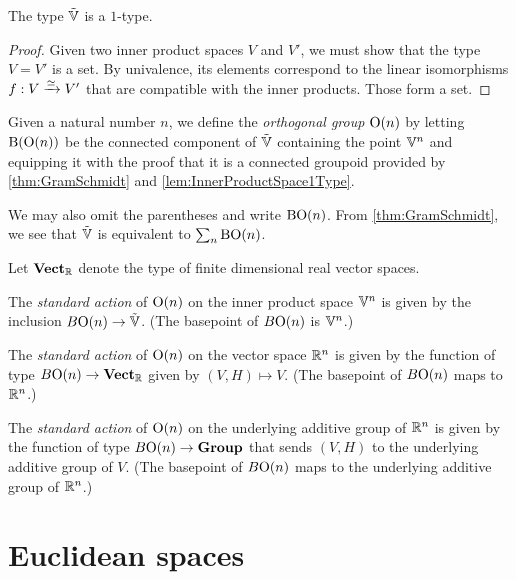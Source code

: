 \begin{lemma}\label{lem:InnerProductSpace1Type}
  The type ${\tilde {\mathbb V}}$ is a $1$-type.
\end{lemma}

\begin{proof}
  Given two inner product spaces $V$ and $V'$, we must show that the type
  $V=V'$ is a set.  By univalence, its elements correspond to the linear
  isomorphisms $f : V \xrightarrow {\simeq} V'$ that are compatible with the
  inner products.  Those form a set.
\end{proof}

\begin{definition}\label{def:OrthogonalGroup}
  Given a natural number $n$, we define the {\em orthogonal group} $\mathrm O(n)$
  by letting $\mathrm B (\mathrm O(n))$ be the connected component of ${\tilde {\mathbb V}}$ containing
  the point $\mathbb V^n$ and equipping it with the proof that it is a connected
  groupoid provided by \cref{thm:GramSchmidt} and
  \cref{lem:InnerProductSpace1Type}.
\end{definition}

We may also omit the parentheses and write $\mathrm B\mathrm O(n)$.
From \cref{thm:GramSchmidt}, we see that ${\tilde {\mathbb V}}$ is equivalent to $\sum_n \mathrm B \mathrm O(n)$.

Let $\mathbf{Vect}_{\mathbb{R}}$ denote the type of finite dimensional real vector spaces.

\begin{definition}\label{def:OrthogonalGroupStandardAction}
  The {\em standard action} of $\mathrm O(n)$ on the inner product space $\mathbb V^n$ is given
  by the inclusion $B \mathrm O(n) \to {\tilde {\mathbb V}}$.
  (The basepoint of $B \mathrm O(n)$ is $\mathbb V^n$.)

  The {\em standard action} of $\mathrm O(n)$ on the vector space $\mathbb{R}^n$ is given
  by the function of type $B \mathrm O(n) \to \mathbf{Vect}_{\mathbb{R}}$ given by
  $(V,H) \mapsto V$.
  (The basepoint of $B \mathrm O(n)$ maps to $\mathbb{R}^n$.)

  The {\em standard action} of $\mathrm O(n)$ on the underlying additive group of $\mathbb{R}^n$ is given
  by the function of type $B \mathrm O(n) \to \mathbf{Group}$ that sends
  $(V,H)$ to the underlying additive group of $V$.
  (The basepoint of $B \mathrm O(n)$ maps to the underlying additive group of $\mathbb{R}^n$.)
\end{definition}
  
\section{Euclidean spaces}

